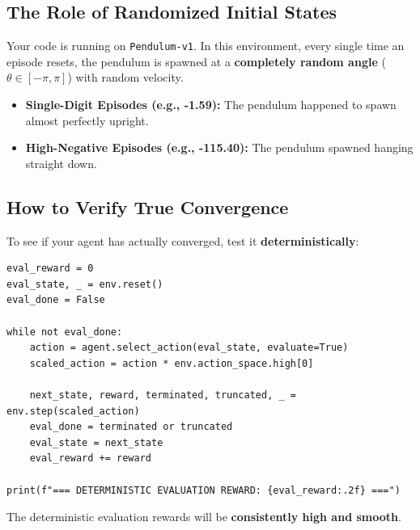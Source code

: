 \documentclass[12pt,a4paper]{article}
\theoremstyle{noteplain}
\theoremstyle{noteexercise}
\begin{document}
\subsection{The Role of Randomized Initial States}\label{ssec:random-init}



Your code is running on \texttt{Pendulum-v1}. In this environment, every single time an episode resets, the pendulum is spawned at a \textbf{completely random angle} ($\theta \in [-\pi, \pi]$) with random velocity.

\begin{itemize}
  \item \textbf{Single-Digit Episodes (e.g., -1.59):} The pendulum happened to spawn almost perfectly upright.
  \item \textbf{High-Negative Episodes (e.g., -115.40):} The pendulum spawned hanging straight down.
\end{itemize}



\subsection{How to Verify True Convergence}\label{ssec:verify}



To see if your agent has actually converged, test it \textbf{deterministically}:

\begin{lstlisting}
eval_reward = 0
eval_state, _ = env.reset()
eval_done = False

while not eval_done:
    action = agent.select_action(eval_state, evaluate=True)
    scaled_action = action * env.action_space.high[0]
    
    next_state, reward, terminated, truncated, _ = env.step(scaled_action)
    eval_done = terminated or truncated
    eval_state = next_state
    eval_reward += reward

print(f"=== DETERMINISTIC EVALUATION REWARD: {eval_reward:.2f} ===")
\end{lstlisting}

The deterministic evaluation rewards will be \textbf{consistently high and smooth}.





\end{document}
